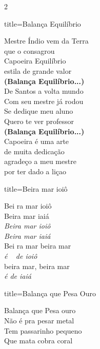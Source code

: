 \documentclass[fontsize=14pt, paper=a4, twoside, DIV=20]{scrreprt} %
\begin{document}
\begin{multicols*}{2}
\begin{song}{title={Balança Equilíbrio}}
\begin{verse*}
        Mestre Índio vem da Terra\\
        que o consagrou\\
        Capoeira Equilíbrio\\
        estila de grande valor\\
        \textbf{(Balança Equilíbrio...)}\\

        De Santos a volta mundo\\
        Com seu mestre já rodou\\
        Se dedique meu aluno\\
        Quero te ver professor\\
        \textbf{(Balança Equilíbrio...)}\\

        Capoeira é uma arte\\
        de muita dedicação\\
        agradeço a meu mestre\\
        por ter dado a liçao\\
    \end{verse*}
\end{song}

\begin{song}{title={Beira mar ioiô}}
    \begin{verse*}
        Bei ra mar ioiô\\
        Beira mar iaiá\\
        \textit{Beira mar ioiô}\\
        \textit{Beira mar iaiá}\\

        Bei ra mar beira mar\\
        \textit{é} \ \textit{ de ioiô}\\
        beira mar, beira mar\\
        \textit{é de iaiá}\\
    \end{verse*}
\end{song}

\begin{song}{title={Balança que Pesa Ouro}}
        \begin{verse*}
        Balança que Pesa ouro \\
        Não é pra pesar metal \\
        Tem passarinho pequeno \\
        Que mata cobra coral \\


\end{verse*}
\end{song}
\end{multicols*}
\end{document}
